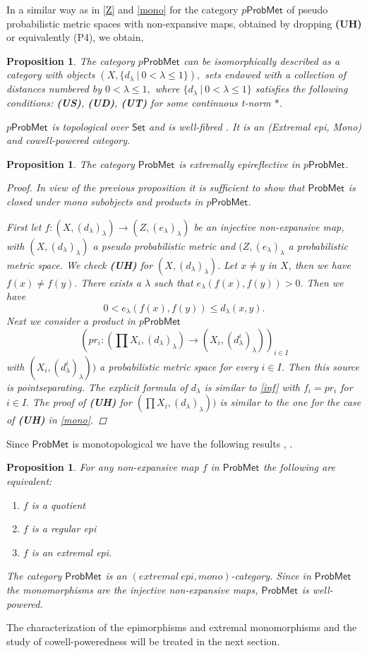 \documentclass[12pt,a4paper]{amsart}
\theoremstyle{theorem}
\newtheorem{proposition}[theorem]{Proposition}
\theoremstyle{definition}
\newcommand{\PM}{\ensuremath{\mathsf{ProbMet_{}}}}
\renewcommand{\l}{\ensuremath{\lambda}}
\def\rw{\rightarrow}
\begin{document}
{In a similar way as in \ref{Z} and \ref{mono} for the category $p\PM$ of pseudo probabilistic metric spaces with non-expansive maps, obtained by dropping {\bf(UH)} or equivalently (P4),
we obtain, 
\begin{proposition}\label{topolog}
The category $p\PM$ can be isomorphically described as a category with objects $(X, \{d_\l \ | \ 0< \l \leq 1\}),$ sets endowed with a collection of distances numbered by $ 0< \l \leq 1,$ where $\{d_\l \ | \ 0< \l \leq 1\}$
satisfies the following conditions: {\bf(US)}, {\bf(UD)}, {\bf(UT)}  for some continuous t-norm $*$. 

$p\PM$ is topological over $\mathsf{Set} $ and is well-fibred  \cite{AHS}. It is an (Extremal epi, Mono) and cowell-powered category.
\end{proposition}

\begin{proposition}
The category $\PM$ is extremally epireflective in $p\PM.$
\begin{proof}
In view of the previous proposition it is sufficient to show that $\PM$ is closed under mono subobjects and products in $p\PM.$

First let $f: (X,(d_\l)_\l) \rw (Z, (e_\l)_\l)$ be an injective non-expansive map, with $(X,(d_\l)_\l)$ a pseudo probabilistic metric and $(Z, (e_\l)_\l$ a probabilistic metric space. We check {\bf(UH)} for $(X,(d_\l)_\l).$
Let $x \not = y$ in $X$, then we have $f(x) \not = f(y).$ There exists a $\l$ such that $e_\l (f(x), f(y)) > 0.$ Then we have
$$
0< e_\l (f(x), f(y)) \leq d_\l (x,y).
$$
Next we consider a product in $p\PM$
$$(pr_i: (\prod{X_i}, (d_\l )_\l)\rw (X_i, (d^i_\l)_\l))_{i \in I}$$
 with $(X_i, (d^i_\l)_\l))$ a probabilistic metric space for every $i \in I$. Then this source is pointseparating. The explicit formula of $d_\l$ is similar to \eqref{inf} with $f_i = pr_i$ for $i \in I.$ The proof of {\bf(UH)} for $(\prod{X_i}, (d_\l)_\l))$ is similar to the one for the case of 
{\bf(UH)} in \ref{mono}.
\end{proof}
\end{proposition}

Since $\PM$ is monotopological we have the following results \cite{Nel}, \cite{AHS}.
\begin{proposition}
For any non-expansive map $f$ in $\PM$ the following are equivalent:
\begin{enumerate}
\item $f$ is a quotient
\item $f$ is a regular epi
\item $f$ is an extremal epi.
\end{enumerate}
The category $\PM$ is an $(extremal \ epi, mono)$-category.
Since in $\PM$ the monomorphisms are the injective non-expansive maps, $\PM$ is well-powered.
\end{proposition}
The characterization of the epimorphisms and extremal monomorphisms and the study of cowell-poweredness will be treated in the next section.

}
\end{document}
